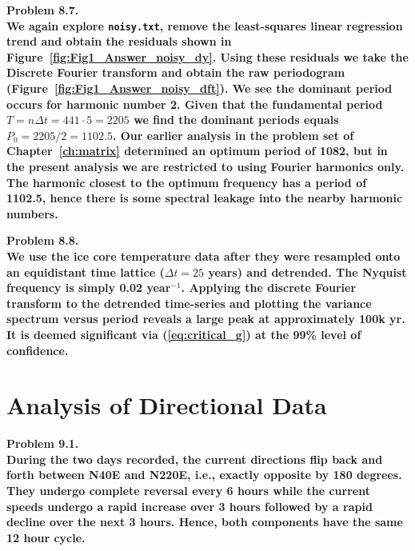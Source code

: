 \noindent
\bf{Problem 8.7.} \\

We again explore \texttt{noisy.txt}, remove the least-squares linear regression trend and obtain the residuals shown in Figure~\ref{fig:Fig1_Answer_noisy_dy}.
Using these residuals we take the Discrete Fourier transform and obtain the raw periodogram (Figure~\ref{fig:Fig1_Answer_noisy_dft}). We see the dominant period occurs for harmonic number 2.  Given that
the fundamental period $T = n\Delta t = 441 \cdot 5 = 2205$ we find the dominant
periods equals $P_0 = 2205/2 = 1102.5$.  Our earlier analysis in the problem set of Chapter~\ref{ch:matrix}
determined an optimum period of 1082, but in the
present analysis we are restricted to using Fourier harmonics only.  The harmonic closest to the optimum frequency
has a period of 1102.5, hence there is some spectral leakage into the nearby harmonic numbers.

\noindent
\bf{Problem 8.8.} \\

We use the ice core temperature data after they were resampled onto an equidistant time lattice ($\Delta t = 25$ years)
and detrended.  The Nyquist frequency is simply 0.02 year$^{-1}$. Applying the discrete Fourier transform
to the detrended time-series and plotting the variance spectrum versus period reveals a
large peak at approximately 100k yr.  It is deemed significant via (\ref{eq:critical_g}) at the 99\% level of confidence.

\section{Analysis of Directional Data}

\noindent
\bf{Problem 9.1.} \\

During the two days recorded, the current directions flip back and forth between N40E and N220E, i.e.,
exactly opposite by 180 degrees.  They undergo complete reversal every 6 hours while the current speeds undergo
a rapid increase over 3 hours followed by a rapid decline over the next 3 hours.  Hence, both components have the
same 12 hour cycle. \\

